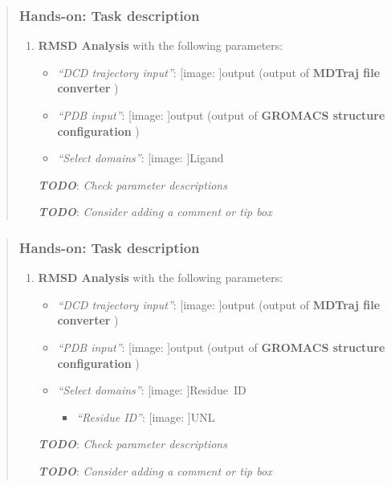 \documentclass[twocolumn]{bmcart}%
\def\texttt{[image: ]}
\providecommand{\tightlist}{%
  \setlength{\itemsep}{0pt}\setlength{\parskip}{0pt}}
\begin{document}
\begin{quote}
\hypertarget{hands-on-task-description-10}{%
\subsubsection{Hands-on: Task
description}\label{hands-on-task-description-10}}

\begin{enumerate}
\def\labelenumi{\arabic{enumi}.}
\tightlist
\item
  \textbf{RMSD Analysis} with the following parameters:

  \begin{itemize}
  \tightlist
  \item
    \emph{``DCD trajectory input''}: \texttt{output} (output of
    \textbf{MDTraj file converter} )
  \item
    \emph{``PDB input''}: \texttt{output} (output of \textbf{GROMACS
    structure configuration} )
  \item
    \emph{``Select domains''}: \texttt{Ligand}
  \end{itemize}

  \textbf{\emph{TODO}}: \emph{Check parameter descriptions}

  \textbf{\emph{TODO}}: \emph{Consider adding a comment or tip box}
\end{enumerate}


\end{quote}

\begin{quote}
\hypertarget{hands-on-task-description-11}{%
\subsubsection{Hands-on: Task
description}\label{hands-on-task-description-11}}

\begin{enumerate}
\def\labelenumi{\arabic{enumi}.}
\tightlist
\item
  \textbf{RMSD Analysis} with the following parameters:

  \begin{itemize}
  \tightlist
  \item
    \emph{``DCD trajectory input''}: \texttt{output} (output of
    \textbf{MDTraj file converter} )
  \item
    \emph{``PDB input''}: \texttt{output} (output of \textbf{GROMACS
    structure configuration} )
  \item
    \emph{``Select domains''}: \texttt{Residue\ ID}

    \begin{itemize}
    \tightlist
    \item
      \emph{``Residue ID''}: \texttt{UNL}
    \end{itemize}
  \end{itemize}

  \textbf{\emph{TODO}}: \emph{Check parameter descriptions}

  \textbf{\emph{TODO}}: \emph{Consider adding a comment or tip box}
\end{enumerate}


\end{quote}
\end{document}
